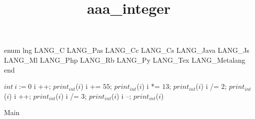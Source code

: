 \documentclass[8pt]{article}
\title{aaa\_integer}
\begin{document}
\maketitle
enum lng 
  LANG\_C
   LANG\_Pas
   LANG\_Cc
   LANG\_Cs
   LANG\_Java
   LANG\_Js
   LANG\_Ml
   LANG\_Php
   LANG\_Rb
   LANG\_Py
   LANG\_Tex
   LANG\_Metalang
end


\begin{algorithm}[H]
$int\:i := 0$\;
i ++;
$print_{int}$($ i $)\;
i += $ 55 $;
$print_{int}$($ i $)\;
i *= $ 13 $;
$print_{int}$($ i $)\;
i /= $ 2 $;
$print_{int}$($ i $)\;
i ++;
$print_{int}$($ i $)\;
i /= $ 3 $;
$print_{int}$($ i $)\;
i --;
$print_{int}$($ i $)\;
\caption{Main}
\end{algorithm}
\end{document}

